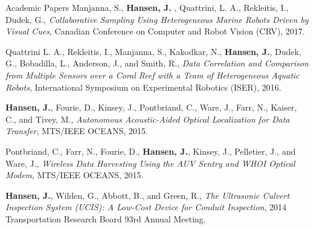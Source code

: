 \documentclass{resume} %
\begin{document}
\begin{rSection}{Academic Papers}
Manjanna, S., \textbf{ Hansen, J. }, Quattrini, L. A., Rekleitis, I., Dudek, G., 
\textit{Collaborative Sampling Using Heterogeneous Marine Robots Driven by Visual Cues}, Canadian Conference on Computer and Robot Vision (CRV), 2017. 
                
Quattrini L. A., Rekleitis, I., Manjanna, S., Kakodkar, N., \textbf{Hansen, J.},   Dudek, G.,  Bobadilla, L.,  Anderson, J., and Smith, R.,
            \textit{Data Correlation and Comparison from Multiple Sensors over a Coral Reef with a Team of Heterogeneous Aquatic Robots},
             International Symposium on Experimental Robotics (ISER),
              2016.

\textbf{Hansen, J.}, Fourie, D., Kinsey, J., Pontbriand, C., Ware, J., Farr, N., Kaiser, C., and Tivey, M., \textit{Autonomous Acoustic-Aided Optical Localization for Data Transfer}, MTS/IEEE OCEANS, 2015.

Pontbriand, C., Farr, N., Fourie, D., \textbf{Hansen, J.},  Kinsey, J., Pelletier, J., and Ware, J., 
 \textit{Wireless Data Harvesting Using the AUV Sentry and WHOI Optical Modem}, MTS/IEEE OCEANS, 2015.

\textbf{Hansen, J.}, Wilden, G., Abbott, B., and Green, R., \textit{The Ultrasonic Culvert
Inspection System (UCIS): A Low-Cost Device for Conduit Inspection}, 2014 Transportation
Research Board 93rd Annual Meeting. 
\end{rSection}
\vspace{-.2cm}
\end{document}
